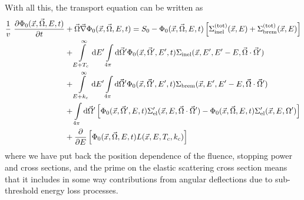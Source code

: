 With all this, the transport equation can be written as
\begin{equation}
\label{transport2}
\begin{split}
\frac{1}{v}~{\partial \Phi_0(\vec{x},\vec{\Omega},E,t) \over
\partial t} & + \vec{\Omega} \vec{\nabla} \Phi_0(\vec{x},\vec{\Omega},E,t) =
S_0
 - \Phi_0(\vec{x},\vec{\Omega},E,t)
\left[ \Sigma_{\rm inel}^{\rm (tot)}(\vec{x},E) +
\Sigma_{\rm brem}^{\rm (tot)}(\vec{x},E)
\right] \\
& +
 \int\limits_{E+T_c}^\infty {\rm d}E' \int\limits_{4 \pi}
{\rm d} \vec{\Omega}' \Phi_0(\vec{x},\vec{\Omega}',E',t)
\Sigma_{\rm inel}(\vec{x},E',E'-E,\vec{\Omega}\cdot\vec{\Omega}') \\
& +  \int\limits_{E+k_c}^\infty {\rm d}E' \int\limits_{4 \pi}
{\rm d} \vec{\Omega}' \Phi_0(\vec{x},\vec{\Omega}',E',t)
\Sigma_{\rm brem}(\vec{x},E',E'-E,\vec{\Omega}\cdot\vec{\Omega}') \\
& +
 \int\limits_{4 \pi} {\rm d}\vec{\Omega}'
\left[ \Phi_0(\vec{x},\vec{\Omega}',E,t)
\Sigma_{\rm el}'(\vec{x},E,\vec{\Omega}\cdot\vec{\Omega}') -
\Phi_0(\vec{x},\vec{\Omega},E,t) \Sigma_{\rm el}'(\vec{x},E,\Omega') \right] \\
& + \frac{\partial}{\partial E} \left[
\Phi_0(\vec{x},\vec{\Omega},E,t) L(\vec{x},E,T_c,k_c) \right]
\end{split}
\end{equation}
where we have put back the position dependence of the fluence,
stopping power and cross sections, and the prime on the elastic scattering
cross section means that it includes in some way contributions
from angular deflections due to sub-threshold energy loss processes.

